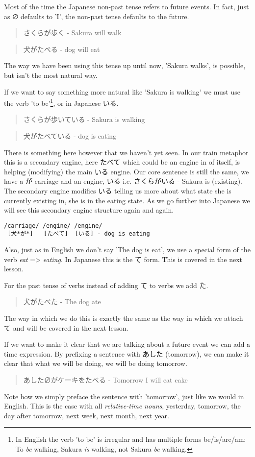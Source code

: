 \documentclass[11pt]{article}
\begin{document}
Most of the time the Japanese non-past tense refers to future events. In fact, just as ∅ defaults to 'I', the non-past tense defaults to the future.
\begin{quote}
さくらが歩く - Sakura will walk
\end{quote}
\begin{quote}
犬がたべる - dog will eat
\end{quote}
The way we have been using this tense up until now, 'Sakura walks', is possible, but isn't the most natural way.

If we want to say something more natural like 'Sakura is walking' we must use the verb 'to be'\footnote{In English the verb 'to be' is irregular and has multiple forms be/is/are/am: To \emph{be} walking, Sakura \emph{is} walking, not Sakura \emph{be} walking.}, or in Japanese いる.
\begin{quote}
さくらが歩いている - Sakura is walking
\end{quote}
\begin{quote}
犬がたべている - dog is eating
\end{quote}
There is something here however that we haven't yet seen. In our train metaphor this is a secondary engine, here たべて which could be an engine in of itself, is helping (modifying) the main いる engine. Our core sentence is still the same, we have a が carriage and an engine, いる i.e. さくらがいる - Sakura is (existing). The secondary engine modifies いる telling us more about what state she is currently existing in, she is in the eating state. As we go further into Japanese we will see this secondary engine structure again and again.
\begin{verbatim}
/carriage/ /engine/ /engine/
 [犬*が*]   [たべて]  [いる] - dog is eating
\end{verbatim}

Also, just as in English we don't say 'The dog is eat', we use a special form of the verb \emph{eat} => \emph{eating}. In Japanese this is the て form. This is covered in the next lesson.

For the past tense of verbs instead of adding て to verbs we add た.
\begin{quote}
犬がたべた - The dog ate
\end{quote}
The way in which we do this is exactly the same as the way in which we attach て and will be covered in the next lesson.

If we want to make it clear that we are talking about a future event we can add a time expression. By prefixing a sentence with あした (tomorrow), we can make it clear that what we will be doing, we will be doing tomorrow.
\begin{quote}
あした∅がケーキをたべる - Tomorrow I will eat cake
\end{quote}
Note how we simply preface the sentence with 'tomorrow', just like we would in English. This is the case with all \emph{relative-time nouns}, yesterday, tomorrow, the day after tomorrow, next week, next month, next year.
\end{document}
